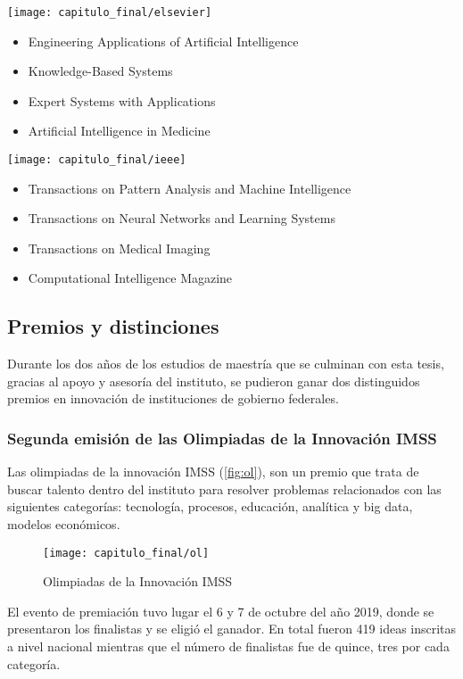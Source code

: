 \parbox[c]{0.7\textwidth}{\texttt{[image: capitulo\_final/elsevier]}}
\begin{itemize}
    \item Engineering Applications of Artificial Intelligence
    \item Knowledge-Based Systems
    \item Expert Systems with Applications
    \item Artificial Intelligence in Medicine
\end{itemize} 
\parbox[c]{0.7\textwidth}{\texttt{[image: capitulo\_final/ieee]}}
\begin{itemize}
    \item Transactions on Pattern Analysis and Machine Intelligence
    \item Transactions on Neural Networks and Learning Systems
    \item Transactions on Medical Imaging
    \item Computational Intelligence Magazine
\end{itemize}

\subsection{Premios y distinciones}

Durante los dos años de los estudios de maestría que se culminan con esta tesis,
gracias al apoyo y asesoría del instituto, se pudieron ganar dos distinguidos
premios en innovación de instituciones de gobierno federales.

\subsubsection{Segunda emisión de las Olimpiadas de la Innovación IMSS}

Las olimpiadas de la innovación IMSS (\autoref{fig:ol}), son un premio que trata
de buscar talento dentro del instituto para resolver problemas relacionados con
las siguientes categorías: tecnología, procesos, educación, analítica y big
data, modelos económicos.

\begin{figure}[H]
    \centering
    \texttt{[image: capitulo\_final/ol]}
    \caption{Olimpiadas de la Innovación IMSS}\label{fig:ol}
\end{figure}

El evento de premiación tuvo lugar el 6 y 7 de octubre del año 2019, donde se
presentaron los finalistas y se eligió el ganador. En total fueron 419 ideas
inscritas a nivel nacional mientras que el número de finalistas fue de quince,
tres por cada categoría.

